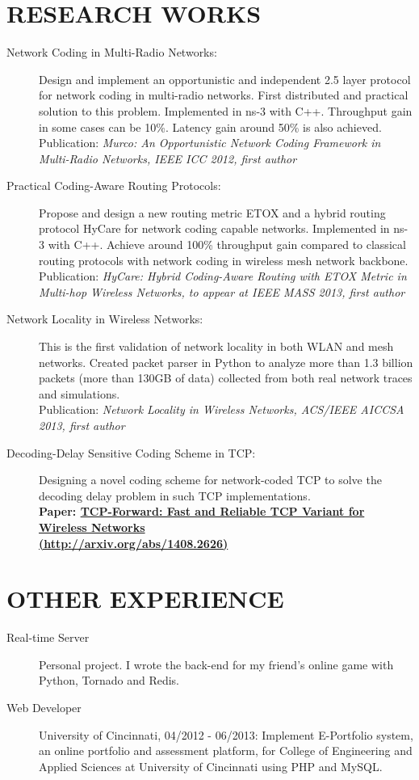 \documentclass[line]{res}
\begin{document}
\begin{resume}
	\section{RESEARCH WORKS}
	\begin{description}
		\item[Network Coding in Multi-Radio Networks:]
			Design and implement an opportunistic and independent 2.5 layer protocol for network coding in multi-radio networks. First distributed and practical solution to this problem. Implemented in ns-3 with C++. Throughput gain in some cases can be 10\%. Latency gain around 50\% is also achieved. \\
			Publication: \emph{Murco: An Opportunistic Network Coding Framework in Multi-Radio Networks, IEEE ICC 2012, first author}
		\item[Practical Coding-Aware Routing Protocols:]
			Propose and design a new routing metric ETOX and a hybrid routing protocol HyCare for network coding capable networks. Implemented in ns-3 with C++. Achieve around 100\% throughput gain compared to classical routing protocols with network coding in wireless mesh network backbone.\\
			Publication: \emph{HyCare: Hybrid Coding-Aware Routing with ETOX Metric in Multi-hop Wireless Networks, to appear at IEEE MASS 2013, first author}
		\item[Network Locality in Wireless Networks:]
			This is the first validation of network locality in both WLAN and mesh networks. Created packet parser in Python to analyze more than 1.3 billion packets (more than 130GB of data) collected from both real network traces and simulations. \\
			Publication: \emph{Network Locality in Wireless Networks, ACS/IEEE AICCSA 2013, first author}
		\item [Decoding-Delay Sensitive Coding Scheme in TCP:]
			Designing a novel coding scheme for network-coded TCP to solve the decoding delay problem in such TCP implementations. \\
			\textbf{Paper: \href{http://arxiv.org/abs/1408.2626}{TCP-Forward: Fast and Reliable TCP Variant for Wireless Networks \\ (http://arxiv.org/abs/1408.2626)}}
	\end{description}
	
	\section{OTHER EXPERIENCE}
	\begin{description}
		\item[Real-time Server] Personal project. I wrote the back-end for my friend's online game with Python, Tornado and Redis.
		\item[Web Developer] University of Cincinnati, 04/2012 - 06/2013: Implement E-Portfolio system, an online portfolio and assessment platform, for College of Engineering and Applied Sciences at University of Cincinnati using PHP and MySQL. 
	\end{description}

\end{resume}
\end{document}
